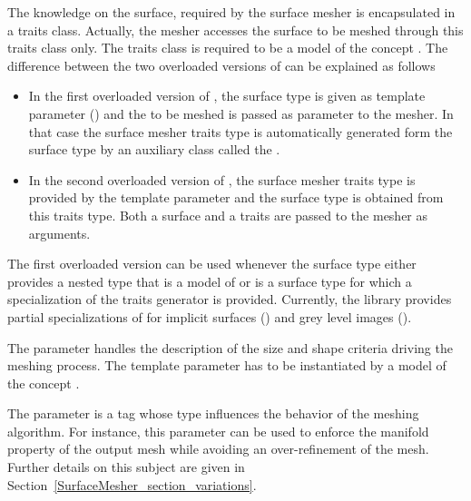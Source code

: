 The knowledge on the surface, required by the surface mesher
is  encapsulated in a
traits class. Actually, the mesher accesses the surface to be meshed
through this traits class only. 
The traits class is required to be a model
of the concept . 
The difference between the two overloaded versions of
can be explained as follows
\begin{itemize}
\item
In the first  overloaded version
of ,  the surface type  is given  
as template parameter  () and the 
to be meshed is passed as parameter to the mesher.
In that case the surface mesher traits type 
is  automatically generated form the surface type
by an auxiliary class called  the .
\item In the second overloaded version of , 
the surface mesher traits type is provided
by the  template parameter 
and the surface type is obtained from this traits type.
Both  a surface and a traits 
are passed to the mesher as arguments. 
\end{itemize}


The first overloaded version can be used
whenever the surface type either provides  a nested type
that is  a model of 
or is a surface type for which a specialization
of the traits generator 
is provided.
Currently, the library provides partial specializations
of  
for implicit surfaces () and 
grey level images ().



The parameter  handles the description of the size and shape
criteria driving the meshing process. The template parameter 
has to be instantiated by a model of the concept .


The parameter   is a tag 
whose type influences the behavior of the
meshing algorithm. For instance, this parameter
can be used to enforce the manifold property
of the output mesh while avoiding 
an over-refinement of the mesh. Further details on this
subject are given in 
Section~\ref{SurfaceMesher_section_variations}.

